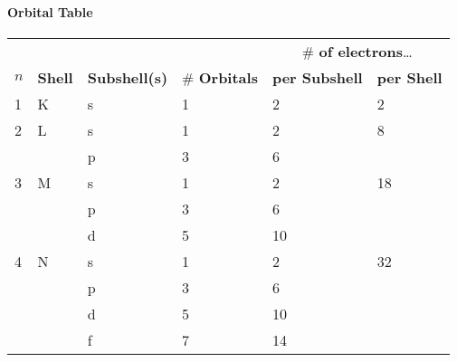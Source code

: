 \paragraph{Orbital Table}
\renewcommand{\arraystretch}{1.1}
\setlength{\oldtabcolsep}{\tabcolsep}\setlength\tabcolsep{3pt}
{\small     %
    \begin{tabularx}{\linewidth}{@{}llllll@{}}
            &                &                      &                      & \multicolumn{2}{c}{\# \textbf{of electrons}\dots}                      \\
        $n$ & \textbf{Shell} & \textbf{Subshell(s)} & \# \textbf{Orbitals} & \textbf{per Subshell}                             & \textbf{per Shell} \\
        1   & K              & s                    & 1                    & 2                                                 & 2                  \\
        \cmidrule{1-6}
        2   & L              & s                    & 1                    & 2                                                 & 8                  \\
            &                & p                    & 3                    & 6                                                 &                    \\
        \cmidrule{1-6}
        3   & M              & s                    & 1                    & 2                                                 & 18                 \\
            &                & p                    & 3                    & 6                                                 &                    \\
            &                & d                    & 5                    & 10                                                &                    \\
        \cmidrule{1-6}
        4   & N              & s                    & 1                    & 2                                                 & 32                 \\
            &                & p                    & 3                    & 6                                                 &                    \\
            &                & d                    & 5                    & 10                                                &                    \\
            &                & f                    & 7                    & 14                                                &
    \end{tabularx}
}           %
\renewcommand{\arraystretch}{1}
\setlength{\tabcolsep}{\oldtabcolsep}

